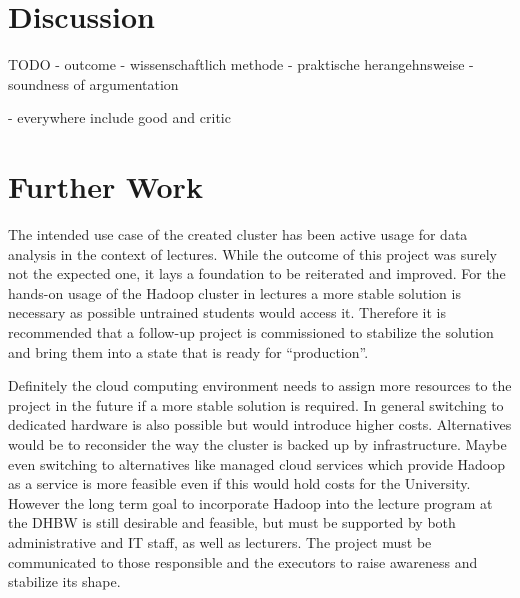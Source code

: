 \section{Discussion}


TODO
- outcome
- wissenschaftlich methode
- praktische herangehnsweise
- soundness of argumentation

- everywhere include good and critic


\section{Further Work}

The intended use case of the created cluster has been active usage for data analysis in the context of lectures.
While the outcome of this project was surely not the expected one, 
it lays a foundation to be reiterated and improved.
For the hands-on usage of the Hadoop cluster in lectures a more stable 
solution is necessary as possible untrained students would access it.
Therefore it is recommended that a follow-up project is commissioned to stabilize the solution and bring them into a state that is ready for \enquote{production}.

Definitely the cloud computing environment needs to assign more resources to the project in the future if a more stable solution is required.
In general switching to dedicated hardware is also possible but would introduce higher costs.
Alternatives would be to reconsider the way the cluster is backed up by infrastructure.
Maybe even switching to alternatives like managed cloud services which provide Hadoop as a service is more feasible even if this would hold costs for the University.
However the long term goal to incorporate Hadoop into the lecture program at the \ac{DHBW} is still desirable and feasible, but must be supported by both administrative and \ac{IT} staff, as well as lecturers. 
The project must be communicated to those responsible and the executors to raise awareness and stabilize its shape.



